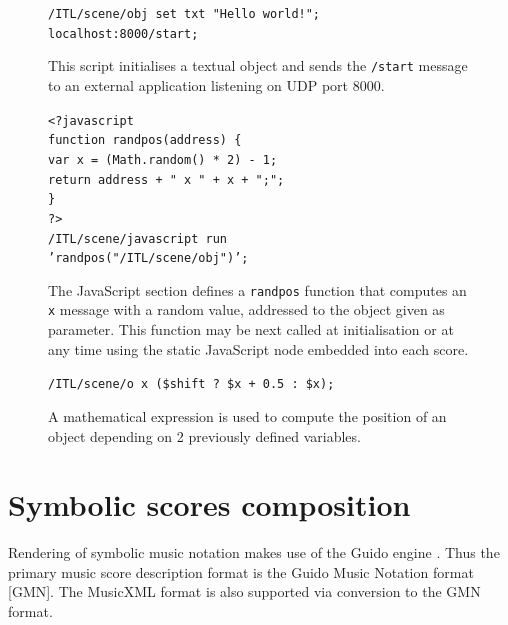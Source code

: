 \documentclass[11pt,a4paper]{article}
\newcommand{\OSC}[1]	{{\fontsize{10pt}{10pt} \selectfont\texttt{#1}}}
\newcommand{\tab}		{\hspace*{4mm}}
\newcommand{\sample}[1]	{\vspace{-0.2em}\begin{center}\colorbox{mygrey}{\begin{minipage}[t]{0.98\columnwidth} {\small \texttt{#1}}\end{minipage}}\end{center}}
\begin{document}
\begin{figure}[ht]
\begin{center}
\sample{/ITL/scene/obj set txt "Hello world!"; \\
localhost:8000/start;
}
\caption{This script initialises a textual object and sends the \OSC{/start} message to an external application listening on UDP port 8000.}
\label{fig:eosc}
\end{center}
\end{figure}

\begin{figure}[ht]
\begin{center}
\sample{<?javascript \\
\tab function randpos(address) \{\\
\tab \tab var x = (Math.random() * 2) - 1;\\
\tab \tab return address + " x " + x + ";"; \\
\tab\}\\
?> \\
/ITL/scene/javascript run \\
\tab \tab \tab \tab 'randpos("/ITL/scene/obj")'; 
}
\caption{The JavaScript section defines a \OSC{randpos} function that computes an \OSC{x} message with a random value, addressed to the object given as parameter. This function may be next called at initialisation or at any time using the static JavaScript node embedded into each score.}
\label{fig:java}
\end{center}
\end{figure}

\begin{figure}[ht]
\begin{center}
\sample{/ITL/scene/o x (\$shift ? \$x + 0.5 : \$x);
}
\caption{A mathematical expression is used to compute the position of an object depending on 2 previously defined variables. }
\label{fig:math}
\end{center}
\end{figure}
 

\section{Symbolic scores composition}
\label{sec:scorecompo}

Rendering of symbolic music notation makes use of the Guido engine \cite{Dau:09b}. Thus the primary music score description format is the Guido Music Notation format \cite{hoos98} [GMN]. The MusicXML format \cite{good01} is also supported via conversion to the GMN format. 
\end{document}
